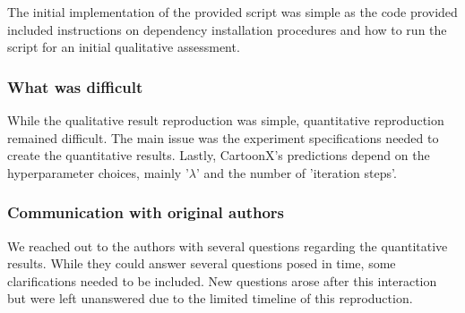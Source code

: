 The initial implementation of the provided script was simple as the code provided included instructions on dependency installation procedures and how to run the script for an initial qualitative assessment.

\subsubsection*{What was difficult}

While the qualitative result reproduction was simple, quantitative reproduction remained difficult. The main issue was the experiment specifications needed to create the quantitative results. Lastly, CartoonX's predictions depend on the hyperparameter choices, mainly '$\lambda$' and the number of 'iteration steps'. 

\subsubsection*{Communication with original authors}

We reached out to the authors with several questions regarding the quantitative results. While they could answer several questions posed in time, some clarifications needed to be included. New questions arose after this interaction but were left unanswered due to the limited timeline of this reproduction.
